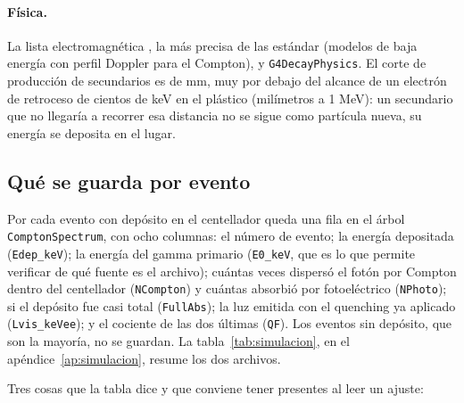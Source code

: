 \documentclass[11pt,a4paper]{article}
\begin{document}
\paragraph{Física.} La lista electromagnética \SimFisica, la más precisa de
las estándar (modelos de baja energía con perfil Doppler para el Compton), y
\texttt{G4DecayPhysics}. El corte de producción de secundarios es de
\SimCorte{} mm, muy por debajo del alcance de un electrón de retroceso
de cientos de keV en el plástico (milímetros a 1 MeV): un secundario que no
llegaría a recorrer esa distancia no se sigue como partícula nueva, su
energía se deposita en el lugar.

\subsection{Qué se guarda por evento}

Por cada evento con depósito en el centellador queda una fila en el árbol
\texttt{ComptonSpectrum}, con ocho columnas: el número de evento; la energía
depositada (\texttt{Edep\_keV}); la energía del gamma primario
(\texttt{E0\_keV}, que es lo que permite verificar de qué fuente es el
archivo); cuántas veces dispersó el fotón por Compton dentro del centellador
(\texttt{NCompton}) y cuántas absorbió por fotoeléctrico (\texttt{NPhoto});
si el depósito fue casi total (\texttt{FullAbs}); la luz emitida con el
quenching ya aplicado (\texttt{Lvis\_keVee}); y el cociente de las dos
últimas (\texttt{QF}). Los eventos sin depósito, que son la mayoría, no se
guardan. La tabla~\ref{tab:simulacion}, en el apéndice~\ref{ap:simulacion}, resume los dos archivos.

Tres cosas que la tabla dice y que conviene tener presentes al leer un
ajuste:
\end{document}
